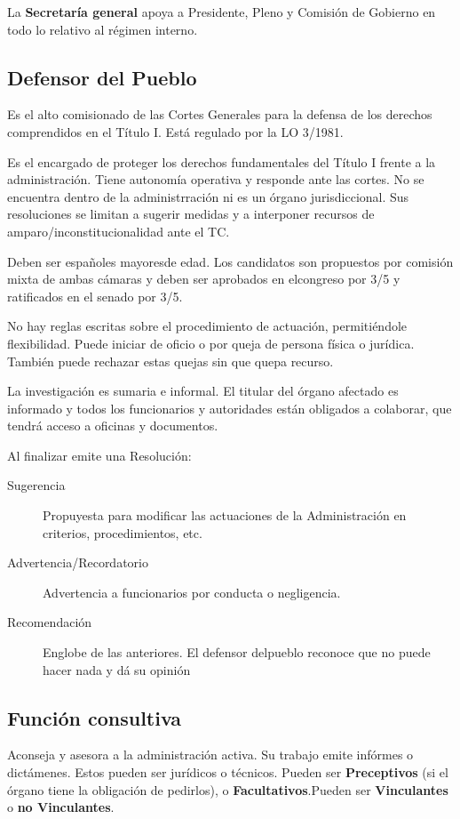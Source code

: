         La \textbf{Secretaría general} apoya a Presidente, Pleno y Comisión de Gobierno en todo lo relativo al régimen interno.


\subsection{Defensor del Pueblo}
    Es el alto comisionado de las Cortes Generales para la defensa de los derechos comprendidos en el Título I. Está regulado por la LO 3/1981.

    Es el encargado de proteger los derechos fundamentales del Título I frente a la administración. Tiene autonomía operativa y responde ante las cortes. No se encuentra dentro de la administrración ni es un órgano jurisdiccional. Sus resoluciones se limitan a sugerir medidas y a interponer recursos de amparo/inconstitucionalidad ante el TC.

    Deben ser españoles mayoresde edad. Los candidatos son propuestos por comisión mixta de ambas cámaras y deben ser aprobados en elcongreso por 3/5 y ratificados en el senado por 3/5.

    No hay reglas escritas sobre el procedimiento de actuación, permitiéndole flexibilidad. Puede iniciar de oficio o por queja de persona física o jurídica. También puede rechazar estas quejas sin que quepa recurso.

    La investigación es sumaria e informal. El titular del órgano afectado es informado y todos los funcionarios y autoridades están obligados a colaborar, que tendrá acceso a oficinas y documentos. 

    Al finalizar emite una Resolución:
    \begin{description}
        \item[Sugerencia] Propuyesta para modificar las actuaciones de la Administración en criterios, procedimientos, etc.
        \item[Advertencia/Recordatorio] Advertencia a funcionarios por conducta o negligencia.
        \item[Recomendación] Englobe de las anteriores. El defensor delpueblo reconoce que no puede hacer nada y dá su opinión
    \end{description}

\subsection{Función consultiva}
    Aconseja y asesora a la administración activa. Su trabajo emite infórmes o dictámenes. Estos pueden ser jurídicos o técnicos. Pueden ser \textbf{Preceptivos} (si el órgano tiene la obligación de pedirlos), o \textbf{Facultativos}.Pueden ser \textbf{Vinculantes} o \textbf{no Vinculantes}.

